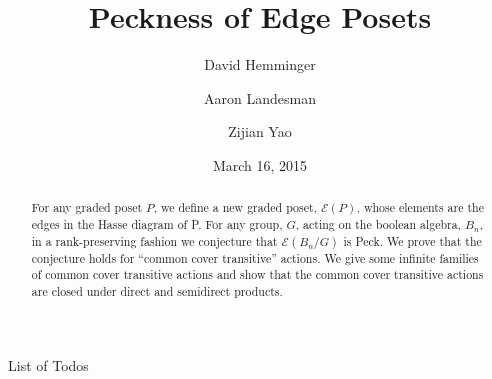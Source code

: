 \documentclass[smallextended, envcountsame, numbook]{svjour3}
\makeatletter
\theoremstyle{plain}
\theoremstyle{definition}
\theoremstyle{remark}
\numberwithin{equation}{section}
\def\listtodoname{List of Todos}
\def\listoftodos{\@starttoc{tdo}\listtodoname}
\makeatother
\begin{document}
\title{Peckness of Edge Posets}

\author{David Hemminger      \and
        Aaron Landesman 		 \and
        Zijian Yao
}


\date{March 16, 2015}


\maketitle



\begin{abstract}
For any graded poset $P$, we define a new graded poset, $\mathcal E(P)$, whose elements are the edges in the Hasse diagram of P. For any group, $G$, acting on the boolean algebra, $B_n$, in a rank-preserving fashion we conjecture that $\mathcal E(B_n/G)$ is Peck. We prove that the conjecture holds for ``common cover transitive'' actions. We give some infinite families of common cover transitive actions and show that the common cover transitive actions are closed under direct and semidirect products.

\end{abstract}
\listoftodos

\newpage
\end{document}
